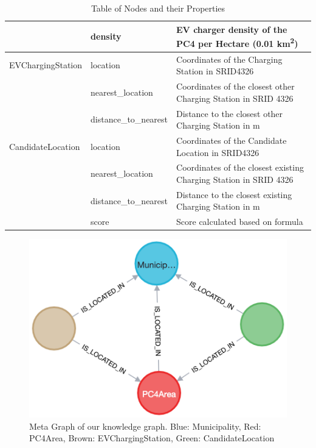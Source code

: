 \documentclass{article}
\begin{document}
\begin{table}[H]
\begin{tabularx}{\textwidth}{l|l|X}
		\cline{2-3}
		                  & density                  & EV charger density of the PC4 per Hectare (0.01 km\textsuperscript{2})  \\
		\hline
		EVChargingStation & location                 & Coordinates of the Charging Station in SRID4326                         \\
		\cline{2-3}
		                  & nearest\_location        & Coordinates of the closest other Charging Station in SRID 4326          \\
		\cline{2-3}
		                  & distance\_to\_nearest    & Distance to the closest other Charging Station in m                     \\
		\hline
		CandidateLocation & location                 & Coordinates of the Candidate Location in SRID4326                       \\
		\cline{2-3}
		                  & nearest\_location        & Coordinates of the closest existing Charging Station in SRID 4326       \\
		\cline{2-3}
		                  & distance\_to\_nearest    & Distance to the closest existing Charging Station in m                  \\
		\cline{2-3}
		                  & score                    & Score calculated based on formula                                       \\
		\hline
	\end{tabularx}
	\caption{Table of Nodes and their Properties}
	\label{table:nodesandproperties}
\end{table}

\begin{figure}[H]
	\centering
	\includegraphics[width=0.5\linewidth]{graph.png}
	\caption{Meta Graph of our knowledge graph. Blue: Municipality, Red: PC4Area, Brown: EVChargingStation, Green: CandidateLocation}
	\label{fig:meta-graph}
\end{figure}
\end{document}
